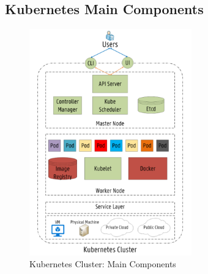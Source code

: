 \subsection{Kubernetes Main Components}
\label{sec:k8s_main_comp}
\begin{figure}
  \includegraphics[width=70mm]{figures/mlcn-k8s-components.pdf}
  \caption{Kubernetes Cluster: Main Components\cite{Santos2019}}
  \label{fig:k8s-comp}
\end{figure}
